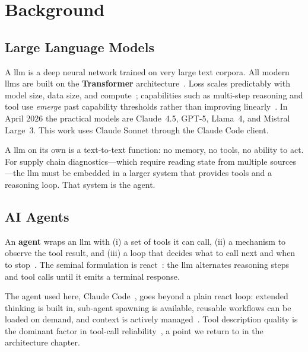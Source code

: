 
\chapter{Background}
\label{ch:background}

\section{Large Language Models}

A \gls{llm} is a deep neural network trained on very large text corpora. All modern \gls{llm}s are built on the \textbf{Transformer} architecture~\cite{vaswani2017attention}. Loss scales predictably with model size, data size, and compute~\cite{kaplan2020scaling,hoffmann2022chinchilla}; capabilities such as multi-step reasoning and tool use \emph{emerge} past capability thresholds rather than improving linearly~\cite{wei2022emergent}. In April 2026 the practical models are Claude~4.5, GPT-5, Llama~4, and Mistral Large~3. This work uses Claude Sonnet through the Claude Code client.

A \gls{llm} on its own is a text-to-text function: no memory, no tools, no ability to act. For supply chain diagnostics---which require reading state from multiple sources---the \gls{llm} must be embedded in a larger system that provides tools and a reasoning loop. That system is the agent.

\section{AI Agents}

An \textbf{agent} wraps an \gls{llm} with (i) a set of tools it can call, (ii) a mechanism to observe the tool result, and (iii) a loop that decides what to call next and when to stop~\cite{weng2023agents}. The seminal formulation is \gls{react}~\cite{yao2023react}: the \gls{llm} alternates reasoning steps and tool calls until it emits a terminal response.

The agent used here, Claude Code~\cite{anthropic2025howccworks}, goes beyond a plain \gls{react} loop: extended thinking is built in, sub-agent spawning is available, reusable workflows can be loaded on demand, and context is actively managed~\cite{anthropic2025contextengineering}. Tool description quality is the dominant factor in tool-call reliability~\cite{anthropic2025writingtools,schick2023toolformer,patil2024gorilla}, a point we return to in the architecture chapter.

